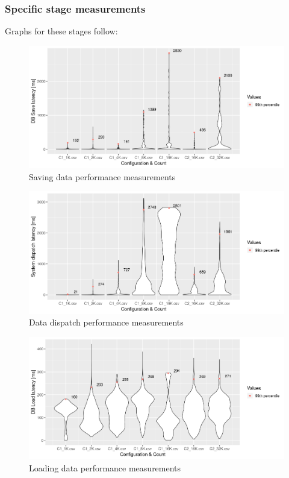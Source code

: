 \subsubsection{Specific stage measurements
}

Graphs for these stages follow:
\begin{figure}[H]
    \centering
    \includegraphics[width=1\textwidth]{obrazky-figures/save.png}
    \caption{Saving data performance measurements}
    \label{img:measure_save}
\end{figure}
\begin{figure}[H]
    \centering
    \includegraphics[width=1\textwidth]{obrazky-figures/dispatch.png}
    \caption{Data dispatch performance measurements}
    \label{img:measure_dispatch}
\end{figure}

\begin{figure}[H]
    \centering
    \includegraphics[width=1\textwidth]{obrazky-figures/load.png}
    \caption{Loading data performance measurements}
    \label{img:measure_load}
\end{figure}


